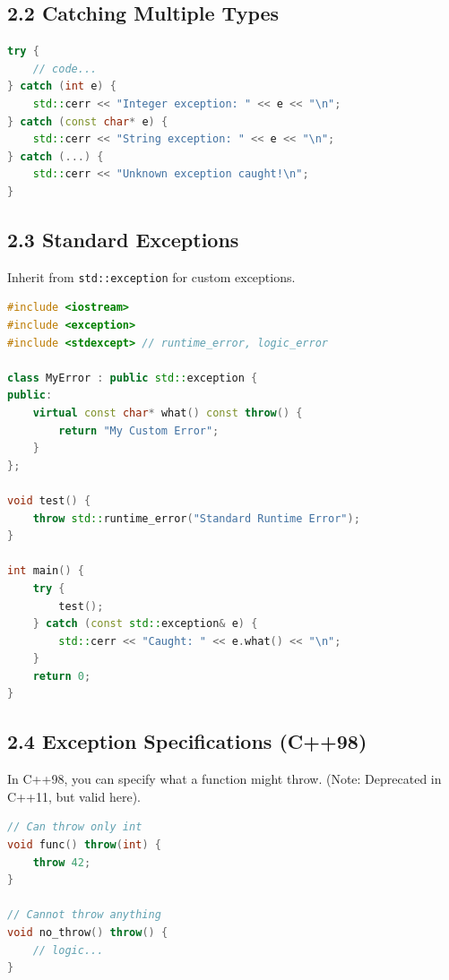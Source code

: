 \hypertarget{catching-multiple-types}{%
\subsection{2.2 Catching Multiple Types}\label{catching-multiple-types}}

\begin{lstlisting}[language={C++}]
try {
    // code...
} catch (int e) {
    std::cerr << "Integer exception: " << e << "\n";
} catch (const char* e) {
    std::cerr << "String exception: " << e << "\n";
} catch (...) {
    std::cerr << "Unknown exception caught!\n";
}
\end{lstlisting}

\hypertarget{standard-exceptions}{%
\subsection{2.3 Standard Exceptions}\label{standard-exceptions}}

Inherit from \passthrough{\lstinline!std::exception!} for custom
exceptions.

\begin{lstlisting}[language={C++}]
#include <iostream>
#include <exception>
#include <stdexcept> // runtime_error, logic_error

class MyError : public std::exception {
public:
    virtual const char* what() const throw() {
        return "My Custom Error";
    }
};

void test() {
    throw std::runtime_error("Standard Runtime Error");
}

int main() {
    try {
        test();
    } catch (const std::exception& e) {
        std::cerr << "Caught: " << e.what() << "\n";
    }
    return 0;
}
\end{lstlisting}

\hypertarget{exception-specifications-c98}{%
\subsection{2.4 Exception Specifications
(C++98)}\label{exception-specifications-c98}}

In C++98, you can specify what a function might throw. (Note: Deprecated
in C++11, but valid here).

\begin{lstlisting}[language={C++}]
// Can throw only int
void func() throw(int) {
    throw 42;
}

// Cannot throw anything
void no_throw() throw() {
    // logic...
}
\end{lstlisting}

